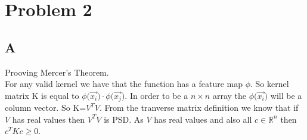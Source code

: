 
\section{Problem 2}
\subsection{A}
Prooving Mercer's Theorem.\\
For any valid kernel we have that the function has a feature map $\phi$.
So kernel matrix K is equal to $\phi\big( \overrightarrow{x_i}\big) \cdot \phi\big( \overrightarrow{x_j}\big)$.
In order to be a $n\times n$ array the $\phi\big( \overrightarrow{x_i}\big)$ will be a column vector.
So K=$V^TV$. From the tranverse matrix definition we know that if $V$ has real values then $V^TV$ is 
PSD. As $V$ has real values and also all $c \in \mathbb{R}^n$ then $c^TKc \geq 0$.

